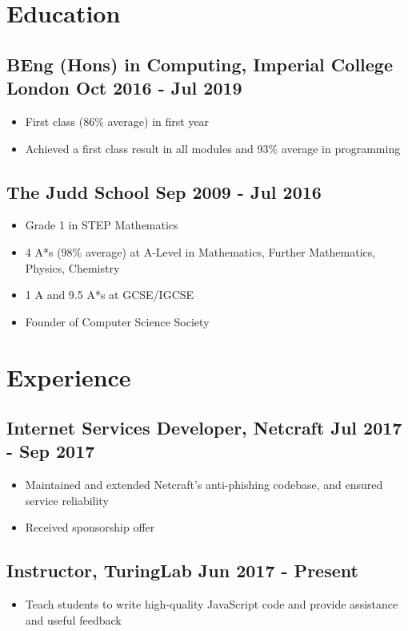 \documentclass[a4paper]{article}
\begin{document}
\begin{minipage}[t]{.66\textwidth}

\section*{Education}

\subsection*{BEng (Hons) in Computing, Imperial College London \hfill Oct 2016 - Jul 2019}
\begin{itemize}
	\item First class (86\% average) in first year
	\item Achieved a first class result in all modules and 93\% average in programming
\end{itemize}

\subsection*{The Judd School \hfill Sep 2009 - Jul 2016}
\begin{itemize}
	\item Grade 1 in STEP Mathematics
	\item 4 A*s (98\% average) at A-Level in Mathematics, Further Mathematics, Physics, Chemistry
	\item 1 A$\hat{}$ and 9.5 A*s at GCSE/IGCSE
	\item Founder of Computer Science Society
\end{itemize}


\section*{Experience}

\subsection*{Internet Services Developer, Netcraft \hfill Jul 2017 - Sep 2017}
\begin{itemize}
	\item Maintained and extended Netcraft's anti-phishing codebase, and ensured service reliability
	\item Received sponsorship offer
\end{itemize}

\subsection*{Instructor, TuringLab \hfill Jun 2017 - Present}
\begin{itemize}
	\item Teach students to write high-quality JavaScript code and provide assistance and useful feedback
\end{itemize}


\end{minipage}
\end{document}

